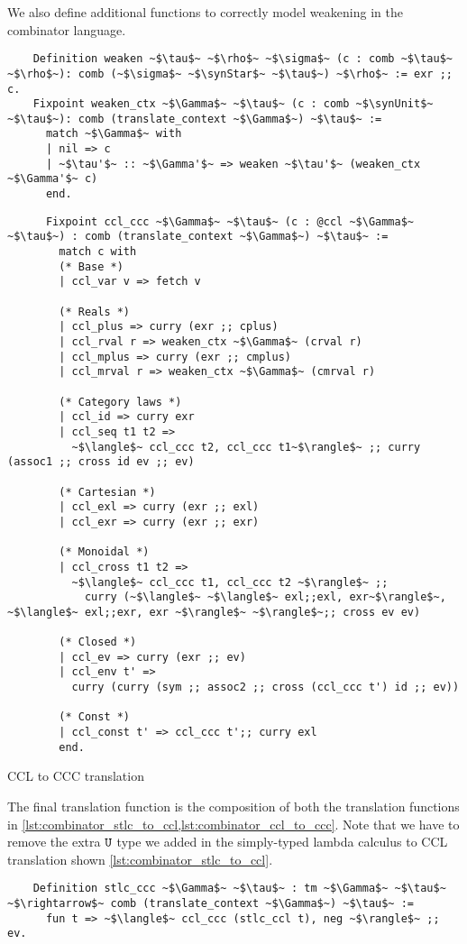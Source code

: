   We also define additional functions to correctly model weakening in the combinator language.

  \begin{verbatim}
    Definition weaken ~$\tau$~ ~$\rho$~ ~$\sigma$~ (c : comb ~$\tau$~ ~$\rho$~): comb (~$\sigma$~ ~$\synStar$~ ~$\tau$~) ~$\rho$~ := exr ;; c.
    Fixpoint weaken_ctx ~$\Gamma$~ ~$\tau$~ (c : comb ~$\synUnit$~ ~$\tau$~): comb (translate_context ~$\Gamma$~) ~$\tau$~ :=
      match ~$\Gamma$~ with
      | nil => c
      | ~$\tau'$~ :: ~$\Gamma'$~ => weaken ~$\tau'$~ (weaken_ctx ~$\Gamma'$~ c)
      end.
  \end{verbatim}


  \begin{listing}
    \begin{verbatim}
      Fixpoint ccl_ccc ~$\Gamma$~ ~$\tau$~ (c : @ccl ~$\Gamma$~ ~$\tau$~) : comb (translate_context ~$\Gamma$~) ~$\tau$~ :=
        match c with
        (* Base *)
        | ccl_var v => fetch v

        (* Reals *)
        | ccl_plus => curry (exr ;; cplus)
        | ccl_rval r => weaken_ctx ~$\Gamma$~ (crval r)
        | ccl_mplus => curry (exr ;; cmplus)
        | ccl_mrval r => weaken_ctx ~$\Gamma$~ (cmrval r)

        (* Category laws *)
        | ccl_id => curry exr
        | ccl_seq t1 t2 =>
          ~$\langle$~ ccl_ccc t2, ccl_ccc t1~$\rangle$~ ;; curry (assoc1 ;; cross id ev ;; ev)

        (* Cartesian *)
        | ccl_exl => curry (exr ;; exl)
        | ccl_exr => curry (exr ;; exr)

        (* Monoidal *)
        | ccl_cross t1 t2 =>
          ~$\langle$~ ccl_ccc t1, ccl_ccc t2 ~$\rangle$~ ;;
            curry (~$\langle$~ ~$\langle$~ exl;;exl, exr~$\rangle$~, ~$\langle$~ exl;;exr, exr ~$\rangle$~ ~$\rangle$~;; cross ev ev)

        (* Closed *)
        | ccl_ev => curry (exr ;; ev)
        | ccl_env t' =>
          curry (curry (sym ;; assoc2 ;; cross (ccl_ccc t') id ;; ev))

        (* Const *)
        | ccl_const t' => ccl_ccc t';; curry exl
        end.
    \end{verbatim}
    \caption{CCL to CCC translation}
    \label{lst:combinator_ccl_to_ccc}
  \end{listing}

  The final translation function is the composition of both the translation functions in \cref{lst:combinator_stlc_to_ccl,lst:combinator_ccl_to_ccc}.
  Note that we have to remove the extra $\texttt{U}$ type we added in the simply-typed lambda calculus to CCL translation shown \cref{lst:combinator_stlc_to_ccl}.

  \begin{verbatim}
    Definition stlc_ccc ~$\Gamma$~ ~$\tau$~ : tm ~$\Gamma$~ ~$\tau$~ ~$\rightarrow$~ comb (translate_context ~$\Gamma$~) ~$\tau$~ :=
      fun t => ~$\langle$~ ccl_ccc (stlc_ccl t), neg ~$\rangle$~ ;; ev.
  \end{verbatim}
